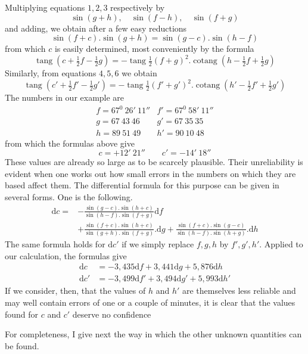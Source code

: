Multiplying equations $1,2,3$ respectively by
\[
\sin(g+h),\quad\sin(f-h),\quad\sin(f+g)
\]
and adding, we obtain after a few easy reductions
\[
\sin(f+c).\sin(g+h)=\sin(g-c).\sin(h-f)
\]
from which $c$ is easily determined, most conveniently by the formula
\[
\operatorname{tang}(c+\tfrac{1}{2}f-\tfrac{1}{2}g)=-\operatorname{tang}\tfrac{1}{2}(f+g)^2.\operatorname{cotang}(h-\tfrac{1}{2}f+\tfrac{1}{2}g)
\]
Similarly, from equations $4,5,6$ we obtain
\[
\operatorname{tang}(c'+\tfrac{1}{2}f'-\tfrac{1}{2}g')=-\operatorname{tang}\tfrac{1}{2}(f'+g')^2.\operatorname{cotang}(h'-\tfrac{1}{2}f'+\tfrac{1}{2}g')
\]
The numbers in our example are
\[
\begin{array}{ll}
f=67^0\ 26'\ 11''&f'=67^0\ 58'\ 11''\\
g=67\ 43\ 46&g'=67\ 35\ 35\\
h=89\ 51\ 49&h'=90\ 10\ 48
\end{array}
\]
from which the formulas above give
\[
c=+12'\ 21''\qquad c'=-14'\ 18''
\]
These values are already so large as to be scarcely plausible. Their unreliability is evident when one works out how small errors in the numbers on which they are based affect them. The differential formula for this purpose can be given in several forms. One is the following.
\[
\begin{aligned}
\mathrm{d}c={}&-\frac{\sin(g-c).\sin(h+c)}{\sin(h-f).\sin(f+g)}\mathrm{d}f\\
&+\frac{\sin(f+c).\sin(h+c)}{\sin(g+h).\sin(f+g)}.\mathrm{d}g
+\frac{\sin(f+c).\sin(g-c)}{\sin(h-f).\sin(h+g)}.\mathrm{d}h
\end{aligned}
\]
The same formula holds for $\mathrm{d}c'$ if we simply replace $f,g,h$ by $f',g',h'$. Applied to our calculation, the formulas give
\[
\begin{aligned}
\mathrm{d}c&=-3{,}435\mathrm{d}f+3{,}441\mathrm{d}g+5{,}876\mathrm{d}h\\
\mathrm{d}c'&=-3{,}499\mathrm{d}f'+3{,}494\mathrm{d}g'+5{,}993\mathrm{d}h'
\end{aligned}
\]
If we consider, then, that the values of $h$ and $h'$ are themselves less reliable and may well contain errors of one or a couple of minutes, it is clear that the values found for $c$ and $c'$ deserve no confidence

For completeness, I give next the way in which the other unknown quantities can be found.

